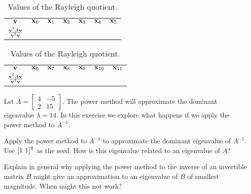 \begin{table}[h]
\begin{center}
\renewcommand{\arraystretch}{1.4}
\begin{tabular}{ccccccc} 
$\mathbf{v}$ &$\mathbf{x}_0$	&$\mathbf{x}_1$	&$\mathbf{x}_2$	&$\mathbf{x}_3$	&$\mathbf{x}_4$	&$\mathbf{x}_5$ 		\\ 
$\frac{\mathbf{v}^{\mathsf{T}}A\mathbf{v}}{\mathbf{v}^{\mathsf{T}}\mathbf{v}}$ 	&\hspace{0.25in}	&\hspace{0.25in}	&\hspace{0.25in}	&\hspace{0.25in}	&\hspace{0.25in}	&\hspace{0.25in}		\\ \hline
\end{tabular}
\begin{tabular}{ccccccc} \hline
$\mathbf{v}$ &$\mathbf{x}_6$	&$\mathbf{x}_7$	&$\mathbf{x}_8$	&$\mathbf{x}_9$	&$\mathbf{x}_{10}$ &$\mathbf{x}_{11}$	\\ 
$\frac{\mathbf{v}^{\mathsf{T}}A\mathbf{v}}{\mathbf{v}^{\mathsf{T}}\mathbf{v}}$ 	&\hspace{0.25in}	&\hspace{0.25in}	&\hspace{0.25in}	&\hspace{0.25in}	&\hspace{0.25in}	&\hspace{0.25in}		\\ 
\end{tabular}
\caption{Values of the Rayleigh quotient.}
\label{T:4_e_1}
\end{center}
\end{table}

\item Let $A = \left[ \begin{array}{cr} 4&-5 \\ 2&15 \end{array} \right]$. The power method will approximate the dominant eigenvalue $\lambda = 14$. In this exercise we explore what happens if we apply the power method to $A^{-1}$. 
\ba
\item Apply the power method to $A^{-1}$ to approximate the dominant eigenvalue of $A^{-1}$.  Use $[1 \ 1]^{\mathsf{T}}$ as the seed. How is this eigenvalue related to an eigenvalue of $A$?

\item Explain in general why applying the power method to the inverse of an invertible matrix $B$ might give an approximation to an eigenvalue of $B$ of smallest magnitude. When might this not work? 

